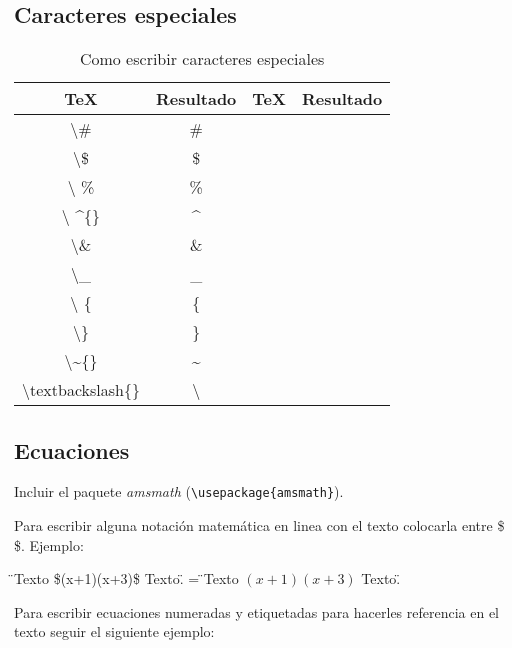\documentclass[12pt, a4paper,twoside]{article} %
\begin{document}
\begin{table}[!htbp]
\subsection{Caracteres especiales}
\vspace{12pt}

    \begin{center}
    \begin{tabular}{|c|c|c|c|}
    \hline
    TeX & Resultado & TeX & Resultado \\ \hline
    \textbackslash{}\# & \# &  &  \\ \hline
    \textbackslash{}\$ & \$ &  &  \\ \hline
    \textbackslash{} \% &  \% &  &  \\ \hline
    \textbackslash{} \^{}\{\}  &  \^{}  &  &  \\ \hline
    \textbackslash{}\&  & \& &  &  \\ \hline
    \textbackslash{}\_ & \_ &  &  \\ \hline
    \textbackslash{} \{ &  \{ &  &  \\ \hline
    \textbackslash{}\}  &  \}  &  &  \\ \hline
    \textbackslash{}\~{}\{\} & \~{} &  &  \\ \hline
    \textbackslash{}textbackslash\{\} &  \textbackslash{} &  &  \\ \hline
\end{tabular}
\end{center}
\caption{Como escribir caracteres especiales}
\label{tab:caracteresespeciales}
\end{table}
\FloatBarrier

\subsection{Ecuaciones}

Incluir el paquete \emph{amsmath} (\lstinline$\usepackage{amsmath}$).

Para escribir alguna notación matemática en linea con el texto colocarla entre \$ \$. Ejemplo: 

\begin{center}
\"{}Texto \$(x+1)(x+3)\$ Texto.\"{} = \"{}Texto $(x+1)(x+3)$ Texto.\"{}
\end{center}

Para escribir ecuaciones numeradas y etiquetadas para hacerles referencia en el texto seguir el siguiente ejemplo:
\end{document}
